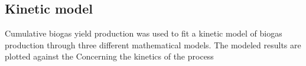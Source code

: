 \subsection{Kinetic model}
Cumulative biogas yield production was used to fit a kinetic model of biogas production through three different mathematical models. The modeled results are plotted against the
Concerning the kinetics of the process